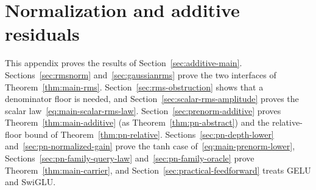 \section{Normalization and additive residuals}
\label{app:normalization}

This appendix proves the results of Section~\ref{sec:additive-main}.
Sections~\ref{sec:rmsnorm} and~\ref{sec:gaussianrms} prove the two
interfaces of Theorem~\ref{thm:main-rms}. Section~\ref{sec:rms-obstruction}
shows that a denominator floor is needed, and
Section~\ref{sec:scalar-rms-amplitude} proves the scalar
law~\eqref{eq:main-scalar-rms-law}. Section~\ref{sec:prenorm-additive}
proves Theorem~\ref{thm:main-additive} (as
Theorem~\ref{thm:pn-abstract}) and the relative-floor bound of
Theorem~\ref{thm:pn-relative}.
Sections~\ref{sec:pn-depth-lower} and~\ref{sec:pn-normalized-gain}
prove the tanh case of~\eqref{eq:main-prenorm-lower},
Sections~\ref{sec:pn-family-query-law} and~\ref{sec:pn-family-oracle}
prove Theorem~\ref{thm:main-carrier}, and
Section~\ref{sec:practical-feedforward} treats GELU and SwiGLU.











